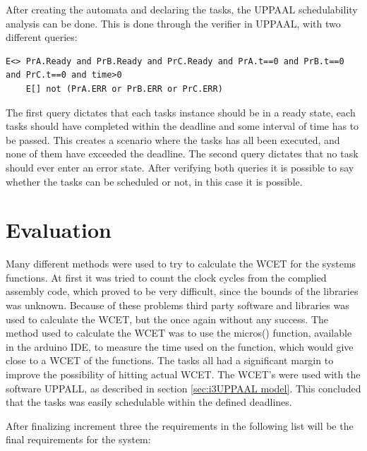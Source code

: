 After creating the automata and declaring the tasks, the UPPAAL schedulability analysis can be done. This is done through the verifier in UPPAAL, with two different queries:

\begin{lstlisting}[caption={Queries for UPPAAL}, label={QueriesAppendix}]
	E<> PrA.Ready and PrB.Ready and PrC.Ready and PrA.t==0 and PrB.t==0 and PrC.t==0 and time>0
	E[] not (PrA.ERR or PrB.ERR or PrC.ERR)
\end{lstlisting}

The first query dictates that each tasks instance should be in a ready state, each tasks should have completed within the deadline and some interval of time has to be passed. This creates a scenario where the tasks has all been executed, and none of them have exceeded the deadline.
The second query dictates that no task should ever enter an error state.
After verifying both queries it is possible to say whether the tasks can be scheduled or not, in this case it is possible.

\section{Evaluation}
\label{sec:i3Evaluation}
Many different methods were used to try to calculate the WCET for the systems functions. At first it was tried to count the clock cycles from the complied assembly code, which proved to be very difficult, since the bounds of the libraries was unknown. Because of these problems third party software and libraries was used to calculate the WCET, but the once again without any success. The method used to calculate the WCET was to use the micros() function, available in the arduino IDE, to measure the time used on the function, which would give close to a WCET of the functions. The tasks all had a significant margin to improve the possibility of hitting actual WCET. \newline
The WCET's were used with the software UPPALL, as described in section \ref{sec:i3UPPAAL model}. This concluded that the tasks was easily schedulable within the defined deadlines.


After finalizing increment three the requirements in the following list will be the final requirements for the system:

